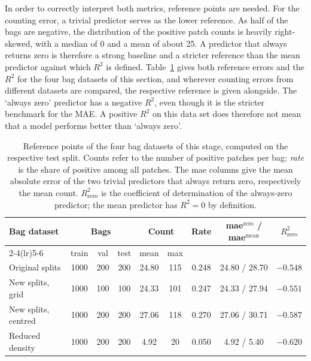 \documentclass[12pt,parskip = half, DIV=classic,listof=totoc]{scrartcl}
\begin{document}
			In order to correctly interpret both metrics, reference points are needed.
			For the counting error, a trivial predictor serves as the lower reference. As half of the bags are
			negative, the distribution of the positive patch counts is heavily right-skewed, with
			a median of 0 and a mean of about 25. A predictor that always returns zero is therefore a 
			strong baseline and a stricter reference than the mean
			predictor against which $R^2$ is defined. Table~\ref{tab:gwhd_reference} gives both
			reference errors and the $R^2$ for the four bag datasets of this section, and wherever counting
			errors from different datasets are compared, the respective reference is given
			alongside. The ‘always zero’ predictor has a negative $R^2$, even though it is the
			stricter benchmark for the MAE. A positive $R^2$ on this data set does therefore not mean that a model
			performs better than ‘always zero’.

			\begin{table}[htbp]
					\centering
					\footnotesize
					\begin{tabular}{@{}lcccccccc@{}}
						\toprule
						\multirow{2}{*}{Bag dataset} & \multicolumn{3}{c}{Bags} & \multicolumn{2}{c}{Count} &
							\multirow{2}{*}{Rate} & \multirow{2}{*}{\acs*{mae}$^{\text{zero}}$ / \acs*{mae}$^{\text{mean}}$} & \multirow{2}{*}{$R^2_{\text{zero}}$} \\
						\cmidrule(lr){2-4}\cmidrule(lr){5-6}
						 & train & val & test & mean & max & & & \\
						\midrule
						Original splits     & 1000 & 200 & 200 & 24.80 & 115 & 0.248 & 24.80 / 28.70 & $-0.548$ \\
						New splits, grid    & 1000 & 100 & 100 & 24.33 & 101 & 0.247 & 24.33 / 27.94 & $-0.551$ \\
						New splits, centred & 1000 & 200 & 200 & 27.06 & 118 & 0.270 & 27.06 / 30.71 & $-0.587$ \\
						Reduced density     & 1000 & 200 & 200 &  4.92 &  20 & 0.050 &  4.92 /  5.40 & $-0.620$ \\
						\bottomrule
					\end{tabular}
					\caption[Reference points of the four bag datasets of this stage, computed on the respective test split]{Reference points of the four bag datasets of this stage, computed on the respective test
					split. Counts refer to the number of positive patches per bag; \emph{rate} is the share of
					positive among all patches. The \acs*{mae} columns give the mean absolute error of the two trivial
					predictors that always return zero, respectively the mean count. $R^2_{\text{zero}}$ is the coefficient of
					determination of the always-zero predictor; the mean predictor has $R^2 = 0$ by definition.}
					\label{tab:gwhd_reference}
			\end{table}
			
\end{document}
